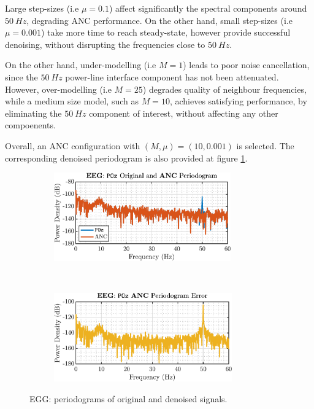 \begin{enumerate}[label=\alph*), leftmargin=*]
Large step-sizes (i.e $\mu = 0.1$) affect significantly the spectral components around $50\ Hz$, degrading ANC performance.
On the other hand, small step-sizes (i.e $\mu = 0.001$) take more time to reach steady-state, however provide successful denoising, without disrupting the frequencies close to $50\ Hz$.

On the other hand, under-modelling (i.e $M = 1$) leads to poor noise cancellation, since the $50\ Hz$ power-line interface component has not been attenuated.
However, over-modelling (i.e $M=25$) degrades quality of neighbour frequencies, while a medium size model, such as $M=10$, achieves satisfying performance, by eliminating the
$50\ Hz$ component of interest, without affecting any other compoenents.

Overall, an ANC configuration with $(M, \mu) = (10, 0.001)$ is selected. The corresponding denoised periodogram is also provided at figure \ref{fig:3_3_d_3}.

\begin{figure}[h]
    \centering
    \begin{subfigure}{0.49\textwidth}
        \centering
        \includegraphics[height=1.5in]{report/adaptive-signal-processing/adaptive-noise-cancellation/assets/d/periodogram}
    \end{subfigure}
    ~
    \begin{subfigure}{0.49\textwidth}
        \centering
        \includegraphics[height=1.5in]{report/adaptive-signal-processing/adaptive-noise-cancellation/assets/d/periodogram-error}
    \end{subfigure}
    \caption{EGG: periodograms of original and denoised signals.}
    \label{fig:3_3_d_3}
\end{figure}

%
\end{enumerate}